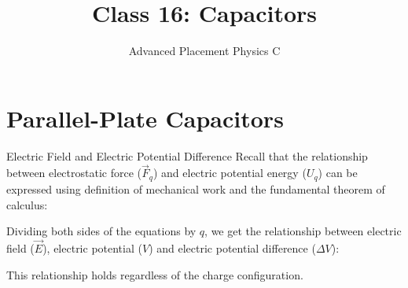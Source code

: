 \documentclass[12pt,aspectratio=169]{beamer}
\title{Class 16: Capacitors}
\subtitle{Advanced Placement Physics C}
\begin{document}
\begin{frame}
  \maketitle
\end{frame}


\section{Parallel-Plate Capacitors}

\begin{frame}{Electric Field and Electric Potential Difference}
  Recall that the relationship between electrostatic force ($\vec F_q$) and
  electric potential energy ($U_q$) can be expressed using definition of
  mechanical work and the fundamental theorem of calculus:


  Dividing both sides of the equations by $q$, we get the relationship between
  electric field ($\vec E$), electric potential ($V$) and electric potential
  difference ($\Delta V$):
  

  This relationship holds regardless of the charge configuration.
\end{frame}
\end{document}

